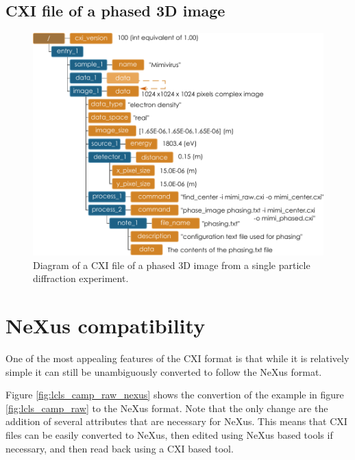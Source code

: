 \documentclass[usletter,11pt]{article}
\begin{document}
\clearpage
\subsection{CXI file of a phased 3D image}

\begin{figure}[h!]
\centering
\includegraphics[width=\textwidth]{phased_image.pdf}
\caption{Diagram of a CXI file of a phased 3D image from a single
particle diffraction experiment.}
\label{fig:phased_image}
\end{figure}

\clearpage

\section{NeXus compatibility}
One of the most appealing features of the CXI format is that while it is relatively simple it can still be unambiguously converted to follow the NeXus format.

Figure \ref{fig:lcls_camp_raw_nexus} shows the convertion of the example in figure \ref{fig:lcls_camp_raw} to the NeXus format. Note that the only change are the addition of several attributes that are necessary for NeXus. This means that CXI files can be easily converted to NeXus, then edited using NeXus based tools if necessary, and then read back using a CXI based tool.
\end{document}
